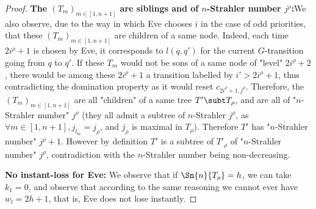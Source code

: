 \documentclass[a4paper,UKenglish,cleveref, autoref, thm-restate]{lipics-v2021}
\begin{document}
\begin{proof}
	\textbf{The $(T_m)_{m\in [1,n+1]}$ are siblings and of $n$-Strahler number $j^\rho$:}We also observe, due to the way in which Eve chooses $i$ in the case of odd priorities, that these $(T_m)_{m\in [1,n+1]}$ are children of a same node. Indeed, each time $2i^\rho+1$ is chosen by Eve, it corresponds to $l(q,q')$ for the current $G$-transition going from $q$ to $q'$. If these $T_m$ would not be sons of a same node of "level" $2i^\rho+2$, there would be among these $2i^\rho +1$ a transition labelled by $i' > 2i^\rho+1$, thus contradicting the domination property as it would reset $c_{2i^\rho+1,j^\rho}$. 
	Therefore, the $(T_m)_{m\in[1,n+1]}$ are all "children" of a same tree $T'\subt T_\rho$, and are all of "$n$-Strahler number" $j^\rho$ (they all admit a subtree of $n$-Strahler $j^\rho$, as $\forall m \in [1,n+1], j_{l_m} = j_\rho$, and $j_\rho$ is maximal in $T_\rho$). Therefore $T'$ has "$n$-Strahler number" $j^\rho+1$. However by definition $T'$ is a subtree of $T'_\rho$ of "$n$-Strahler number" $j^\rho$, contradiction with the $n$-Strahler number being non-decreasing.
	
	\textbf{No instant-loss for Eve:} We observe that if $\Sn{n}{T_\rho} = h$, we can take $k_1 = 0$, and observe that according to the same reasoning we cannot ever have $w_l = 2h+1$, that is, Eve does not lose instantly.
\end{proof} 
\end{document}
